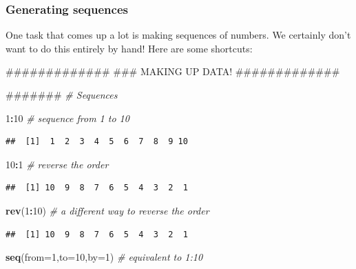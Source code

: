 \documentclass[]{article}
\newenvironment{Shaded}{\begin{snugshade}}{\end{snugshade}}
\newcommand{\KeywordTok}[1]{\textcolor[rgb]{0.13,0.29,0.53}{\textbf{#1}}}
\newcommand{\DataTypeTok}[1]{\textcolor[rgb]{0.13,0.29,0.53}{#1}}
\newcommand{\DecValTok}[1]{\textcolor[rgb]{0.00,0.00,0.81}{#1}}
\newcommand{\CommentTok}[1]{\textcolor[rgb]{0.56,0.35,0.01}{\textit{#1}}}
\newcommand{\OperatorTok}[1]{\textcolor[rgb]{0.81,0.36,0.00}{\textbf{#1}}}
\newcommand{\NormalTok}[1]{#1}
\begin{document}
\subsubsection{Generating sequences}\label{generating-sequences}

One task that comes up a lot is making sequences of numbers. We
certainly don't want to do this entirely by hand! Here are some
shortcuts:

\begin{Shaded}
\begin{Highlighting}[]
\NormalTok{#############}
\NormalTok{### MAKING UP DATA!}
\NormalTok{#############}

\NormalTok{#######}
\CommentTok{# Sequences}

\DecValTok{1}\OperatorTok{:}\DecValTok{10}                        \CommentTok{# sequence from 1 to 10}
\end{Highlighting}
\end{Shaded}

\begin{verbatim}
##  [1]  1  2  3  4  5  6  7  8  9 10
\end{verbatim}

\begin{Shaded}
\begin{Highlighting}[]
\DecValTok{10}\OperatorTok{:}\DecValTok{1}                        \CommentTok{# reverse the order}
\end{Highlighting}
\end{Shaded}

\begin{verbatim}
##  [1] 10  9  8  7  6  5  4  3  2  1
\end{verbatim}

\begin{Shaded}
\begin{Highlighting}[]
\KeywordTok{rev}\NormalTok{(}\DecValTok{1}\OperatorTok{:}\DecValTok{10}\NormalTok{)                   }\CommentTok{# a different way to reverse the order}
\end{Highlighting}
\end{Shaded}

\begin{verbatim}
##  [1] 10  9  8  7  6  5  4  3  2  1
\end{verbatim}

\begin{Shaded}
\begin{Highlighting}[]
\KeywordTok{seq}\NormalTok{(}\DataTypeTok{from=}\DecValTok{1}\NormalTok{,}\DataTypeTok{to=}\DecValTok{10}\NormalTok{,}\DataTypeTok{by=}\DecValTok{1}\NormalTok{)      }\CommentTok{# equivalent to 1:10}
\end{Highlighting}
\end{Shaded}
\end{document}
